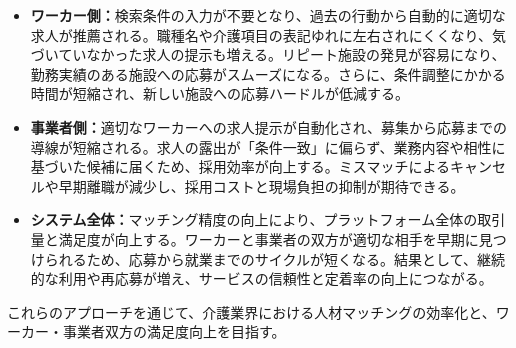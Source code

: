 \begin{itemize}
\item \textbf{ワーカー側：}検索条件の入力が不要となり、過去の行動から自動的に適切な求人が推薦される。職種名や介護項目の表記ゆれに左右されにくくなり、気づいていなかった求人の提示も増える。リピート施設の発見が容易になり、勤務実績のある施設への応募がスムーズになる。さらに、条件調整にかかる時間が短縮され、新しい施設への応募ハードルが低減する。
\item \textbf{事業者側：}適切なワーカーへの求人提示が自動化され、募集から応募までの導線が短縮される。求人の露出が「条件一致」に偏らず、業務内容や相性に基づいた候補に届くため、採用効率が向上する。ミスマッチによるキャンセルや早期離職が減少し、採用コストと現場負担の抑制が期待できる。
\item \textbf{システム全体：}マッチング精度の向上により、プラットフォーム全体の取引量と満足度が向上する。ワーカーと事業者の双方が適切な相手を早期に見つけられるため、応募から就業までのサイクルが短くなる。結果として、継続的な利用や再応募が増え、サービスの信頼性と定着率の向上につながる。
\end{itemize}

これらのアプローチを通じて、介護業界における人材マッチングの効率化と、ワーカー・事業者双方の満足度向上を目指す。
